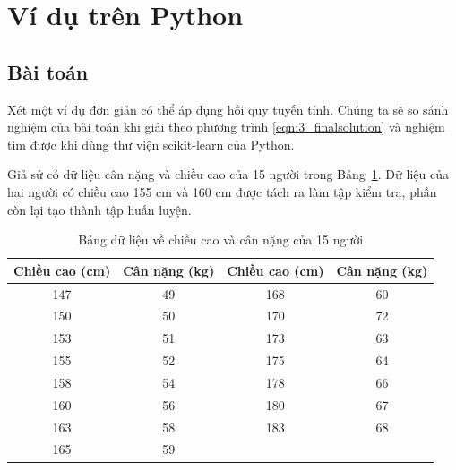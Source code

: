 





\section{Ví dụ trên Python}


\subsection{Bài toán}

Xét một ví dụ đơn giản có thể áp dụng hồi quy tuyến tính. Chúng ta sẽ so
sánh nghiệm của bài toán khi giải theo phương trình \eqref{eqn:3_finalsolution}
và nghiệm tìm được khi dùng thư viện scikit-learn của Python.

Giả sử có dữ liệu cân nặng và chiều cao của 15 người trong Bảng~\ref{tab:3_height_weight}. Dữ liệu của hai người có chiều cao 155 cm và 160 cm được tách ra làm tập kiểm tra, phần còn lại tạo thành tập huấn luyện.

\begin{table}[h!]
\centering
\caption{Bảng dữ liệu về chiều cao và cân nặng của 15 người}
\label{tab:3_height_weight}
\begin{tabular}{|c|c||c|c|}
\hline
\textbf{Chiều cao (cm)} & \textbf{Cân nặng (kg)} & \textbf{Chiều cao (cm)} & \textbf{Cân nặng (kg)} \\ \hline
\hline
147                     & 49                     & 168                     & 60                     \\ \hline
150                     & 50                     & 170                     & 72                     \\ \hline
153                     & 51                     & 173                     & 63                     \\ \hline
155                     & 52                     & 175                     & 64                     \\ \hline
158                     & 54                     & 178                     & 66                     \\ \hline
160                     & 56                     & 180                     & 67                     \\ \hline
163                     & 58                     & 183                     & 68                     \\ \hline
165                     & 59                     &                         &                        \\ \hline
\end{tabular}
\end{table}


